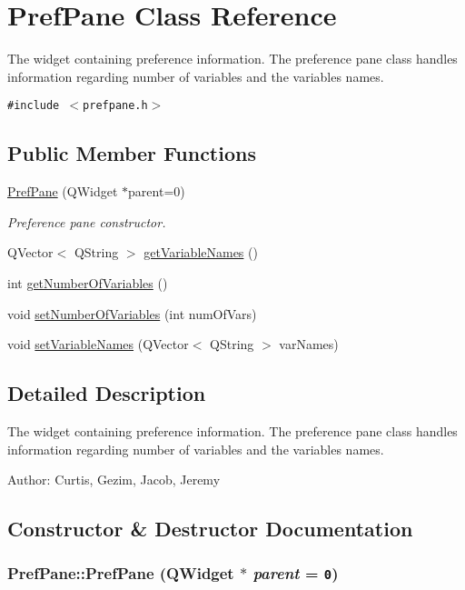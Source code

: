 \hypertarget{classPrefPane}{
\section{PrefPane Class Reference}
\label{classPrefPane}
}
The widget containing preference information. The preference pane class handles information regarding number of variables and the variables names.  


{\tt \#include $<$prefpane.h$>$}

\subsection*{Public Member Functions}
\begin{CompactItemize}
\item 
\hyperlink{classPrefPane_8d0d7fc68477f7e25c8b3db3c0b5c77f}{PrefPane} (QWidget $\ast$parent=0)
\begin{CompactList}\small\item\em Preference pane constructor. \item\end{CompactList}\item 
QVector$<$ QString $>$ \hyperlink{classPrefPane_f2ba42ce01d52d1da885cda71f37f2ab}{getVariableNames} ()
\item 
int \hyperlink{classPrefPane_66e33d34045834467f8f4b13e723c939}{getNumberOfVariables} ()
\item 
void \hyperlink{classPrefPane_d3ba55cc80273cef6ffc494f962c37f7}{setNumberOfVariables} (int numOfVars)
\item 
void \hyperlink{classPrefPane_68b42771287fe3cda331d8e807e11bda}{setVariableNames} (QVector$<$ QString $>$ varNames)
\end{CompactItemize}


\subsection{Detailed Description}
The widget containing preference information. The preference pane class handles information regarding number of variables and the variables names. 

\begin{Desc}
\item[Author:]Curtis, Gezim, Jacob, Jeremy \end{Desc}


\subsection{Constructor \& Destructor Documentation}
\hypertarget{classPrefPane_8d0d7fc68477f7e25c8b3db3c0b5c77f}{
\subsubsection[PrefPane]{\setlength{\rightskip}{0pt plus 5cm}PrefPane::PrefPane (QWidget $\ast$ {\em parent} = {\tt 0})}}
\label{classPrefPane_8d0d7fc68477f7e25c8b3db3c0b5c77f}


